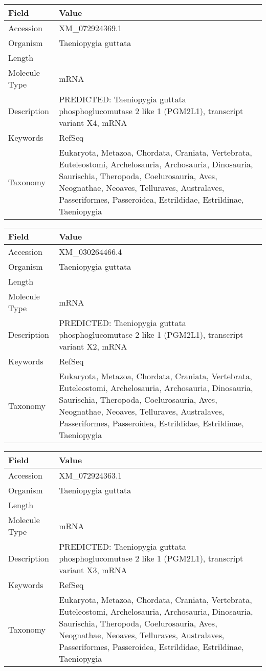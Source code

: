 \documentclass[10pt]{article}
\begin{document}
{\footnotesize
\begin{longtable}{>{\raggedright\arraybackslash}p{4.5cm} >{\raggedright\arraybackslash}p{11.5cm}}
\textbf{Field} & \textbf{Value} \\
\hline
Accession & XM\_072924369.1 \\
Organism & Taeniopygia guttata \\
Length & 5771 \\
Molecule Type & mRNA \\
Description & PREDICTED: Taeniopygia guttata phosphoglucomutase 2 like 1 (PGM2L1), transcript variant X4, mRNA \\
Keywords & RefSeq \\
Taxonomy & Eukaryota, Metazoa, Chordata, Craniata, Vertebrata, Euteleostomi, Archelosauria, Archosauria, Dinosauria, Saurischia, Theropoda, Coelurosauria, Aves, Neognathae, Neoaves, Telluraves, Australaves, Passeriformes, Passeroidea, Estrildidae, Estrildinae, Taeniopygia \\
\end{longtable}
}

{\footnotesize
\begin{longtable}{>{\raggedright\arraybackslash}p{4.5cm} >{\raggedright\arraybackslash}p{11.5cm}}
\textbf{Field} & \textbf{Value} \\
\hline
Accession & XM\_030264466.4 \\
Organism & Taeniopygia guttata \\
Length & 5997 \\
Molecule Type & mRNA \\
Description & PREDICTED: Taeniopygia guttata phosphoglucomutase 2 like 1 (PGM2L1), transcript variant X2, mRNA \\
Keywords & RefSeq \\
Taxonomy & Eukaryota, Metazoa, Chordata, Craniata, Vertebrata, Euteleostomi, Archelosauria, Archosauria, Dinosauria, Saurischia, Theropoda, Coelurosauria, Aves, Neognathae, Neoaves, Telluraves, Australaves, Passeriformes, Passeroidea, Estrildidae, Estrildinae, Taeniopygia \\
\end{longtable}
}

{\footnotesize
\begin{longtable}{>{\raggedright\arraybackslash}p{4.5cm} >{\raggedright\arraybackslash}p{11.5cm}}
\textbf{Field} & \textbf{Value} \\
\hline
Accession & XM\_072924363.1 \\
Organism & Taeniopygia guttata \\
Length & 5809 \\
Molecule Type & mRNA \\
Description & PREDICTED: Taeniopygia guttata phosphoglucomutase 2 like 1 (PGM2L1), transcript variant X3, mRNA \\
Keywords & RefSeq \\
Taxonomy & Eukaryota, Metazoa, Chordata, Craniata, Vertebrata, Euteleostomi, Archelosauria, Archosauria, Dinosauria, Saurischia, Theropoda, Coelurosauria, Aves, Neognathae, Neoaves, Telluraves, Australaves, Passeriformes, Passeroidea, Estrildidae, Estrildinae, Taeniopygia \\
\end{longtable}
}
\end{document}

